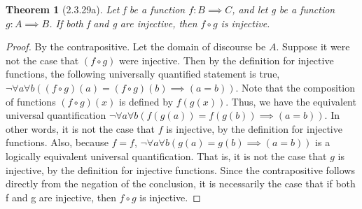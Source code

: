 \documentclass[a4paper, 12pt]{article}
\theoremstyle{plain}
\newtheorem*{theorem*}{Theorem}
\begin{document}
	
	\begin{theorem*}[2.3.29a]
		Let f be a function $f: B \implies C$, and let g be a function $g: A \implies B$. If both f and g are injective, then $f \circ g$ is injective.
	\end{theorem*}
	
	\begin{proof}
		By the contrapositive. Let the domain of discourse be $A$. \newline Suppose it were not the case that $(f \circ g)$ were injective. Then by the \newline definition for injective functions, the following universally quantified \newline statement is true, $\lnot \forall a \forall b ((f \circ g)(a) = (f \circ g)(b) \implies (a = b))$. Note that the composition of functions $(f \circ g)(x)$ is defined by $f(g(x))$. Thus, we have the equivalent universal quantification $\lnot \forall a \forall b (f(g(a)) = f(g(b)) \implies (a = b))$. In other words, it is not the case that $f$ is injective, by the definition for injective functions. Also, because $f = f$, $\lnot \forall a \forall b (g(a) = g(b) \implies (a = b))$ is a logically equivalent universal quantification. That is, it is not the case that $g$ is injective, by the definition for injective functions. Since the contrapositive follows directly from the negation of the conclusion, it is necessarily the case that if both f and g are injective, then $f \circ g$ is injective.
	\end{proof}
\end{document}
